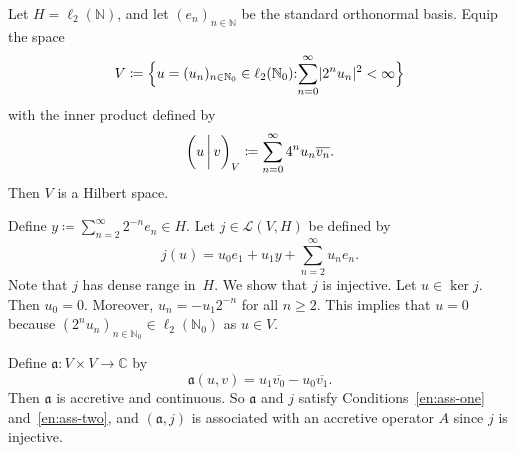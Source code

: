 \documentclass[a4paper,oneside,12pt]{amsart}
\theoremstyle{plain}
\theoremstyle{definition}
\newenvironment{example}
{\pushQED{\qed}

\examplex}
{\popQED\endexamplex}
\let\ge=\geqslant
\DeclarePairedDelimiter\abs{\lvert}{\rvert}
\begin{document}
\begin{example}\label{ex:phillips}
Let $H=\ell_2({\mathbb{N}})$, and let $(e_n)_{n\in{\mathbb{N}}}$ be the standard orthonormal basis. Equip the 
space 
\[
    V \coloneqq {{\ifthenelse{\equal{B}{auto}}{\left\{{u=(u_n)_{n\in{\mathbb{N}}_0}\in\ell_2({\mathbb{N}}_0)}{:} {\sum_{n=0}^\infty\abs{2^n u_n}^2<\infty}\right\}}{}
\ifthenelse{\equal{B}{b}}{\bigl\{{u=(u_n)_{n\in{\mathbb{N}}_0}\in\ell_2({\mathbb{N}}_0)}{:} {\sum_{n=0}^\infty\abs{2^n u_n}^2<\infty}\bigr\}}{}
\ifthenelse{\equal{B}{B}}{\Bigl\{{u=(u_n)_{n\in{\mathbb{N}}_0}\in\ell_2({\mathbb{N}}_0)}{:} {\sum_{n=0}^\infty\abs{2^n u_n}^2<\infty}\Bigr\}}{}
}}
\]
with the inner product defined by
\[
    {{\ifthenelse{\equal{auto}{auto}}{\left({u}\mkern3mu{\biggm|}\mkern3mu {v}\right)}{}
\ifthenelse{\equal{auto}{b}}{\bigl({u}\mkern3mu{\biggm|}\mkern3mu {v}\bigr)}{}
\ifthenelse{\equal{auto}{B}}{\Bigl({u}\mkern3mu{\bigm|}\mkern3mu {v}\Bigr)}{}
}}_V \coloneqq \sum_{n=0}^\infty 4^n u_n{\overline{{v_n}}}.
\]
Then $V$ is a Hilbert space.

Define $y\coloneqq\sum_{n=2}^\infty 2^{-n} e_n\in H$. Let $j\in{\mathcal{L}}(V,H)$ be defined by
\[
    j(u) = u_0 e_1 + u_1 y + \sum_{n=2}^\infty u_n e_n.
\]
Note that $j$ has dense range in~$H$. We show that $j$ is injective. Let $u\in\ker j$. Then $u_0=0$. Moreover, $u_n = -u_1 2^{-n}$ for all $n\ge 2$.
This implies that $u=0$ because $(2^n u_n)_{n\in{\mathbb{N}}_0}\in\ell_2({\mathbb{N}}_0)$ as $u\in V$. 

Define ${{\mathfrak{{a}}}}\colon V\times V\to{\mathbb{C}}$ by 
\[
    {{\mathfrak{{a}}}}(u,v) = u_1{\overline{{v_0}}} - u_0{\overline{{v_1}}}.
\]
Then ${{\mathfrak{{a}}}}$ is accretive and continuous. So ${{\mathfrak{{a}}}}$ and $j$ satisfy Conditions~\ref{en:ass-one} and~\ref{en:ass-two},
and $({{\mathfrak{{a}}}},j)$ is associated with an accretive operator $A$ since $j$ is injective.


\end{example}
\end{document}
